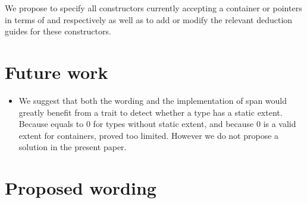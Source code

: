 \documentclass{wg21}
\begin{document}
We propose to specify all constructors currently accepting a container or pointers in terms of  and 
respectively as well as to add or modify the relevant deduction guides for these constructors.

\section{Future work}

\begin{itemize}
	\item We suggest that both the wording and the implementation of span would greatly benefit from a trait to detect whether a type has a static extent.
Because  equals to 0 for types without static extent, and because 0 is a valid extent for containers,  proved too limited. However we do not propose a solution in the present paper.
\end{itemize}

\section{Proposed wording}
\end{document}
